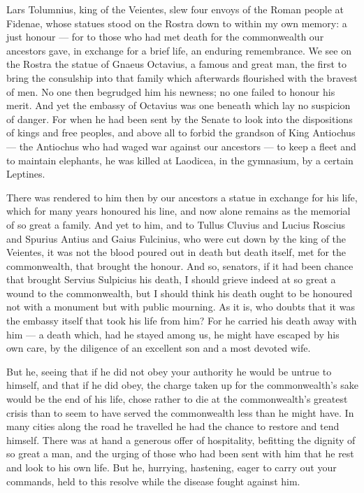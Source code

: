  Lars Tolumnius, king of the Veientes, slew four envoys of the Roman people at Fidenae, whose statues stood on the Rostra down to within my own memory: a just honour --- for to those who had met death for the commonwealth our ancestors gave, in exchange for a brief life, an enduring remembrance. We see on the Rostra the statue of Gnaeus Octavius, a famous and great man, the first to bring the consulship into that family which afterwards flourished with the bravest of men. No one then begrudged him his newness; no one failed to honour his merit. And yet the embassy of Octavius was one beneath which lay no suspicion of danger. For when he had been sent by the Senate to look into the dispositions of kings and free peoples, and above all to forbid the grandson of King Antiochus --- the Antiochus who had waged war against our ancestors --- to keep a fleet and to maintain elephants, he was killed at Laodicea, in the gymnasium, by a certain Leptines.

 There was rendered to him then by our ancestors a statue in exchange for his life, which for many years honoured his line, and now alone remains as the memorial of so great a family. And yet to him, and to Tullus Cluvius and Lucius Roscius and Spurius Antius and Gaius Fulcinius, who were cut down by the king of the Veientes, it was not the blood poured out in death but death itself, met for the commonwealth, that brought the honour. And so, senators, if it had been chance that brought Servius Sulpicius his death, I should grieve indeed at so great a wound to the commonwealth, but I should think his death ought to be honoured not with a monument but with public mourning. As it is, who doubts that it was the embassy itself that took his life from him? For he carried his death away with him --- a death which, had he stayed among us, he might have escaped by his own care, by the diligence of an excellent son and a most devoted wife.

 But he, seeing that if he did not obey your authority he would be untrue to himself, and that if he did obey, the charge taken up for the commonwealth's sake would be the end of his life, chose rather to die at the commonwealth's greatest crisis than to seem to have served the commonwealth less than he might have. In many cities along the road he travelled he had the chance to restore and tend himself. There was at hand a generous offer of hospitality, befitting the dignity of so great a man, and the urging of those who had been sent with him that he rest and look to his own life. But he, hurrying, hastening, eager to carry out your commands, held to this resolve while the disease fought against him.

